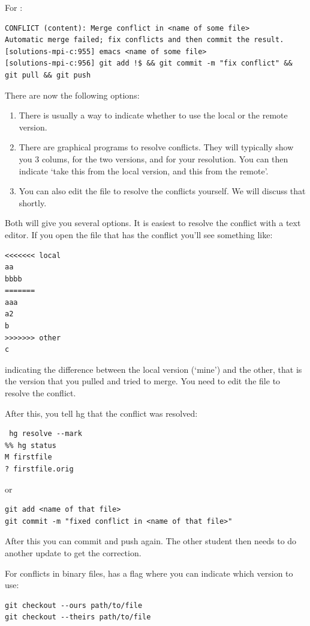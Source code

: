 For :
\begin{verbatim}
CONFLICT (content): Merge conflict in <name of some file>
Automatic merge failed; fix conflicts and then commit the result.
[solutions-mpi-c:955] emacs <name of some file>
[solutions-mpi-c:956] git add !$ && git commit -m "fix conflict" && git pull && git push
\end{verbatim}

There are now the following options:
\begin{enumerate}
\item There is usually a way to indicate whether to use the local or
  the remote version.
\item There are graphical programs to resolve conflicts. They will
  typically show you 3 colums, for the two versions, and for your
  resolution. You can then indicate `take this from the local version,
  and this from the remote'.
\item You can also edit the file to resolve the conflicts yourself. We
  will discuss that shortly.
\end{enumerate}

Both  will give you several options. It is easiest to resolve the
conflict with a text editor. If you open the file that has the conflict
you'll see something like:
\begin{verbatim}
<<<<<<< local
aa
bbbb
=======
aaa
a2
b
>>>>>>> other
c
\end{verbatim}
indicating the difference between the local version (`mine') and the
other, that is the version that you pulled and tried to merge.
You need to edit the file to resolve the conflict.

After this, you tell hg that the conflict was resolved:
\begin{verbatim}
 hg resolve --mark
%% hg status
M firstfile
? firstfile.orig
\end{verbatim}
or
\begin{verbatim}
git add <name of that file>
git commit -m "fixed conflict in <name of that file>"
\end{verbatim}
After this you can commit and push again.
The other student then needs to do another update to get the
correction.

For conflicts in binary files,  has a flag where you can indicate
which version to use:
\begin{verbatim}
git checkout --ours path/to/file
git checkout --theirs path/to/file
\end{verbatim}

